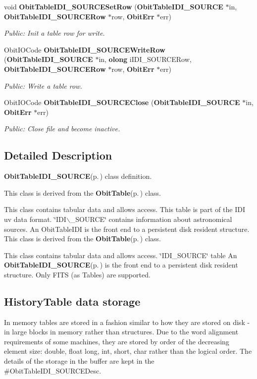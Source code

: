 \begin{CompactItemize}
void {\bf Obit\-Table\-IDI\_\-SOURCESet\-Row} ({\bf Obit\-Table\-IDI\_\-SOURCE} $\ast$in, {\bf Obit\-Table\-IDI\_\-SOURCERow} $\ast$row, {\bf Obit\-Err} $\ast$err)
\begin{CompactList}\small\item\em Public: Init a table row for write. \item\end{CompactList}\item 
Obit\-IOCode {\bf Obit\-Table\-IDI\_\-SOURCEWrite\-Row} ({\bf Obit\-Table\-IDI\_\-SOURCE} $\ast$in, {\bf olong} i\-IDI\_\-SOURCERow, {\bf Obit\-Table\-IDI\_\-SOURCERow} $\ast$row, {\bf Obit\-Err} $\ast$err)
\begin{CompactList}\small\item\em Public: Write a table row. \item\end{CompactList}\item 
Obit\-IOCode {\bf Obit\-Table\-IDI\_\-SOURCEClose} ({\bf Obit\-Table\-IDI\_\-SOURCE} $\ast$in, {\bf Obit\-Err} $\ast$err)
\begin{CompactList}\small\item\em Public: Close file and become inactive. \item\end{CompactList}\end{CompactItemize}


\subsection{Detailed Description}
{\bf Obit\-Table\-IDI\_\-SOURCE}{\rm (p.\,\pageref{structObitTableIDI__SOURCE})} class definition. 

This class is derived from the {\bf Obit\-Table}{\rm (p.\,\pageref{structObitTable})} class.

This class contains tabular data and allows access. This table is part of the IDI uv data format. \char`\"{}IDI$\backslash$\_\-SOURCE\char`\"{} contains information about astronomical sources. An Obit\-Table\-IDI is the front end to a persistent disk resident structure. This class is derived from the {\bf Obit\-Table}{\rm (p.\,\pageref{structObitTable})} class.

This class contains tabular data and allows access. \char`\"{}IDI\_\-SOURCE\char`\"{} table An {\bf Obit\-Table\-IDI\_\-SOURCE}{\rm (p.\,\pageref{structObitTableIDI__SOURCE})} is the front end to a persistent disk resident structure. Only FITS (as Tables) are supported.\subsection{History\-Table data storage}\label{ObitTableWX_8h_TableDataStorage}
In memory tables are stored in a fashion similar to how they are stored on disk - in large blocks in memory rather than structures. Due to the word alignment requirements of some machines, they are stored by order of the decreasing element size: double, float long, int, short, char rather than the logical order. The details of the storage in the buffer are kept in the \#Obit\-Table\-IDI\_\-SOURCEDesc.

